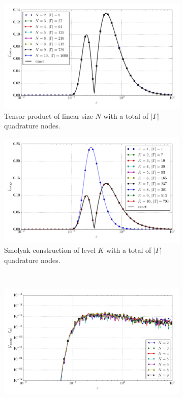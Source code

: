 \documentclass[a4paper,10pt]{article}
\begin{document}
\begin{figure}[ht!]
  \begin{subfigure}[t]{0.5\linewidth}
    \includegraphics[width=\linewidth]{./plots/tp_sg_3d_conv_eps_(1,1,0)_(0,1,1)_val_nsd_tp.pdf}
    \caption{Tensor product of linear size $N$ with a total of $|\Gamma|$ quadrature nodes.}
    \label{fig:tp_sg_3d_conv_p_110_011_val_nsd_tp}
  \end{subfigure}
  \begin{subfigure}[t]{0.5\linewidth}
    \includegraphics[width=\linewidth]{./plots/tp_sg_3d_conv_eps_(1,1,0)_(0,1,1)_val_nsd_gk.pdf}
    \caption{Smolyak construction of level $K$ with a total of $|\Gamma|$ quadrature nodes.}
    \label{fig:tp_sg_3d_conv_p_110_011_val_nsd_gk}
  \end{subfigure} \\
  \begin{subfigure}[t]{0.5\linewidth}
    \includegraphics[width=\linewidth]{./plots/tp_sg_3d_conv_eps_(1,1,0)_(0,1,1)_err_nsd_tp.pdf}

\end{subfigure}
\end{figure}
\end{document}

